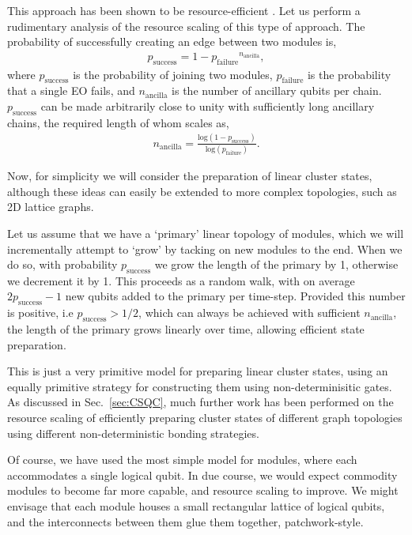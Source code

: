 \documentclass[aps,rmp,twocolumn,amsmath,amssymb,nofootinbib,superscriptaddress,longbibliography,floatfix]{revtex4-1}
\begin{document}
This approach has been shown to be resource-efficient \cite{nielsenoptcs}. Let us perform a rudimentary analysis of the resource scaling of this type of approach. The probability of successfully creating an edge between two modules is,
\begin{align}
p_\mathrm{success} = 1 - {p_\mathrm{failure}}^{n_\mathrm{ancilla}},
\end{align}
where $p_\mathrm{success}$ is the probability of joining two modules, $p_\mathrm{failure}$ is the probability that a single EO fails, and $n_\mathrm{ancilla}$ is the number of ancillary qubits per chain. $p_\mathrm{success}$ can be made arbitrarily close to unity with sufficiently long ancillary chains, the required length of whom scales as,
\begin{align}
n_\mathrm{ancilla} = \frac{\mathrm{log}(1-p_\mathrm{success})}{\mathrm{log}(p_\mathrm{failure})}.
\end{align}

Now, for simplicity we will consider the preparation of linear cluster states, although these ideas can easily be extended to more complex topologies, such as 2D lattice graphs.

Let us assume that we have a `primary' linear topology of modules, which we will incrementally attempt to `grow' by tacking on new modules to the end. When we do so, with probability $p_\mathrm{success}$ we grow the length of the primary by 1, otherwise we decrement it by 1. This proceeds as a random walk, with on average \mbox{$2p_\mathrm{success}-1$} new qubits added to the primary per time-step. Provided this number is positive, i.e \mbox{$p_\mathrm{success}>1/2$}, which can always be achieved with sufficient $n_\mathrm{ancilla}$, the length of the primary grows linearly over time, allowing efficient state preparation.

This is just a very primitive model for preparing linear cluster states, using an equally primitive strategy for constructing them using non-determinisitic gates. As discussed in Sec.~\ref{sec:CSQC}, much further work has been performed on the resource scaling of efficiently preparing cluster states of different graph topologies using different non-deterministic bonding strategies.

Of course, we have used the most simple model for modules, where each accommodates a single logical qubit. In due course, we would expect commodity modules to become far more capable, and resource scaling to improve. We might envisage that each module houses a small rectangular lattice of logical qubits, and the interconnects between them glue them together, patchwork-style.
\end{document}
